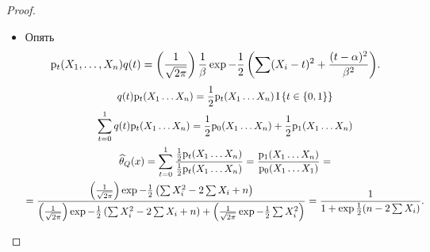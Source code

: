 \begin{proof}
\begin{itemize}
            \item Опять
                \begin{displaymath}
                    \mathrm{p}_{t}{\left(X_1, \ldots ,X_n\right)} q(t) = \left(\frac{1}{\sqrt{2 \pi}}\right) \frac{1}{\beta} \exp{-\frac12 \left(\sum (X_i - t)^2 + \frac{(t - \alpha)^2}{\beta^2}\right)}.
                \end{displaymath}
                \begin{gather*}
                    q(t) \mathrm{p}_{t}{\left(X_1 \ldots X_n\right)} = \frac12 \mathrm{p}_{t}{\left(X_1 \ldots X_n\right)} \operatorname{\mathrm{I}}\left\{t \in \left\{0, 1\right\}\right\} \\
                    \sum_{t = 0}^1 q(t) \mathrm{p}_{t}{\left(X_1 \ldots X_n\right)} = \frac12 \mathrm{p}_{0}{\left(X_1 \ldots X_n\right)} + \frac12 \mathrm{p}_{1}{\left(X_1 \ldots X_n\right)} \\
                    \widehat{\theta}_Q(x) = \sum_{t = 0}^1 \frac{\frac12 \mathrm{p}_{t}{\left(X_1 \ldots X_n\right)}}{\frac12 \mathrm{p}_{t}{\left(X_1 \ldots X_n\right)}}= \frac{\mathrm{p}_{1}{\left(X_1 \ldots X_n\right)}}{\mathrm{p}_{0}{\left(X_1 \ldots X_1\right)}} = \\ =
                    \frac{\left(\frac{1}{\sqrt{2 \pi}}\right) \exp{-\frac12 \left(\sum X_i^2 - 2 \sum X_i + n\right)}}{\left(\frac{1}{\sqrt{2 \pi}}\right) \exp{-\frac12 \left(\sum X_i^2 - 2 \sum X_i + n\right) + \left(\frac{1}{\sqrt{2\pi}} \exp{-\frac12 \sum X_i^2}\right)}} = \frac{1}{1 + \exp{\frac12 (n - 2 \sum X_i)}}.
                \end{gather*}
        \end{itemize}
    \end{proof}
